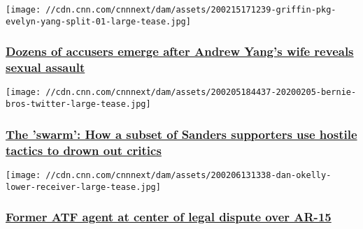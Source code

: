 \href{/2020/02/14/politics/evelyn-yang-doctor-sexual-assault-accusers-invs/index.html}{}

\texttt{[image: //cdn.cnn.com/cnnnext/dam/assets/200215171239-griffin-pkg-evelyn-yang-split-01-large-tease.jpg]}

\hypertarget{dozens-of-accusers-emerge-after-andrew-yangs-wife-reveals-sexual-assault}{%
\subsubsection{\texorpdfstring{\href{/2020/02/14/politics/evelyn-yang-doctor-sexual-assault-accusers-invs/index.html}{Dozens
of accusers emerge after Andrew Yang's wife reveals sexual
assault}}{Dozens of accusers emerge after Andrew Yang's wife reveals sexual assault}}\label{dozens-of-accusers-emerge-after-andrew-yangs-wife-reveals-sexual-assault}}

\href{/2020/02/07/politics/bernie-sanders-social-media-attacks-invs/index.html}{}

\texttt{[image: //cdn.cnn.com/cnnnext/dam/assets/200205184437-20200205-bernie-bros-twitter-large-tease.jpg]}

\hypertarget{the-swarm-how-a-subset-of-sanders-supporters-use-hostile-tactics-to-drown-out-critics}{%
\subsubsection{\texorpdfstring{\href{/2020/02/07/politics/bernie-sanders-social-media-attacks-invs/index.html}{The
'swarm': How a subset of Sanders supporters use hostile tactics to drown
out
critics}}{The 'swarm': How a subset of Sanders supporters use hostile tactics to drown out critics}}\label{the-swarm-how-a-subset-of-sanders-supporters-use-hostile-tactics-to-drown-out-critics}}

\href{/2020/02/07/us/ex-atf-agent-ar-15/index.html}{}

\texttt{[image: //cdn.cnn.com/cnnnext/dam/assets/200206131338-dan-okelly-lower-receiver-large-tease.jpg]}

\hypertarget{former-atf-agent-at-center-of-legal-dispute-over-ar-15}{%
\subsubsection{\texorpdfstring{\href{/2020/02/07/us/ex-atf-agent-ar-15/index.html}{Former
ATF agent at center of legal dispute over
AR-15}}{Former ATF agent at center of legal dispute over AR-15}}\label{former-atf-agent-at-center-of-legal-dispute-over-ar-15}}

